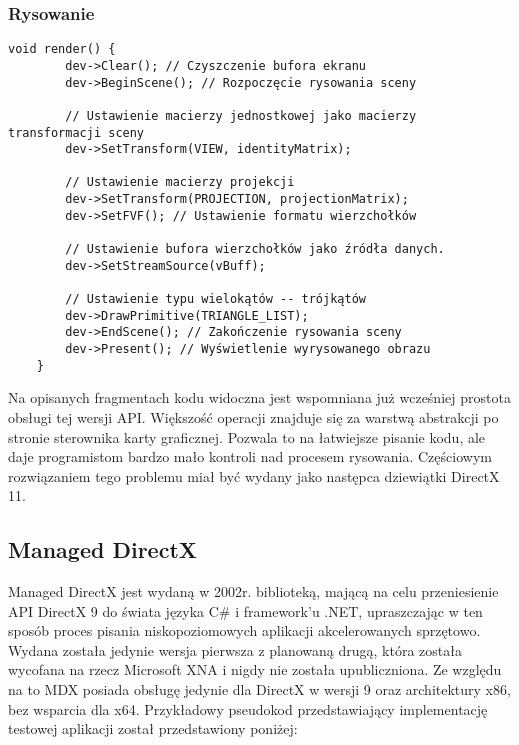 \subsubsection{Rysowanie}
\begin{lstlisting}[caption={Pseudokod rysowania Direct3D 9 (oryginalna treść)}, label={lst:d3d9_render}]
	void render() {
		dev->Clear(); // Czyszczenie bufora ekranu
		dev->BeginScene(); // Rozpoczęcie rysowania sceny
		
		// Ustawienie macierzy jednostkowej jako macierzy transformacji sceny		
		dev->SetTransform(VIEW, identityMatrix);
		
		// Ustawienie macierzy projekcji
		dev->SetTransform(PROJECTION, projectionMatrix);
		dev->SetFVF(); // Ustawienie formatu wierzchołków
		
		// Ustawienie bufora wierzchołków jako źródła danych.
		dev->SetStreamSource(vBuff);
		
		// Ustawienie typu wielokątów -- trójkątów		
		dev->DrawPrimitive(TRIANGLE_LIST);	
		dev->EndScene(); // Zakończenie rysowania sceny		
		dev->Present(); // Wyświetlenie wyrysowanego obrazu
	}
\end{lstlisting}

Na opisanych fragmentach kodu widoczna jest wspomniana już wcześniej
prostota obsługi tej wersji API. Większość operacji znajduje się za
warstwą abstrakcji po stronie sterownika karty graficznej. Pozwala to na
łatwiejsze pisanie kodu, ale daje programistom bardzo mało kontroli nad
procesem rysowania. Częściowym rozwiązaniem tego problemu miał być
wydany jako następca dziewiątki DirectX 11.

\subsection{Managed DirectX}

Managed DirectX jest wydaną w 2002r. biblioteką, mającą na celu
przeniesienie API DirectX 9 do świata języka C\# i framework'u .NET,
upraszczając w ten sposób proces pisania niskopoziomowych aplikacji
akcelerowanych sprzętowo. Wydana została jedynie wersja pierwsza z planowaną drugą, która została
wycofana na rzecz Microsoft XNA i nigdy nie została upubliczniona. Ze
względu na to MDX posiada obsługę jedynie dla DirectX w wersji 9 oraz
architektury x86, bez wsparcia dla x64. Przykładowy pseudokod przedstawiający implementację testowej aplikacji
został przedstawiony poniżej:

